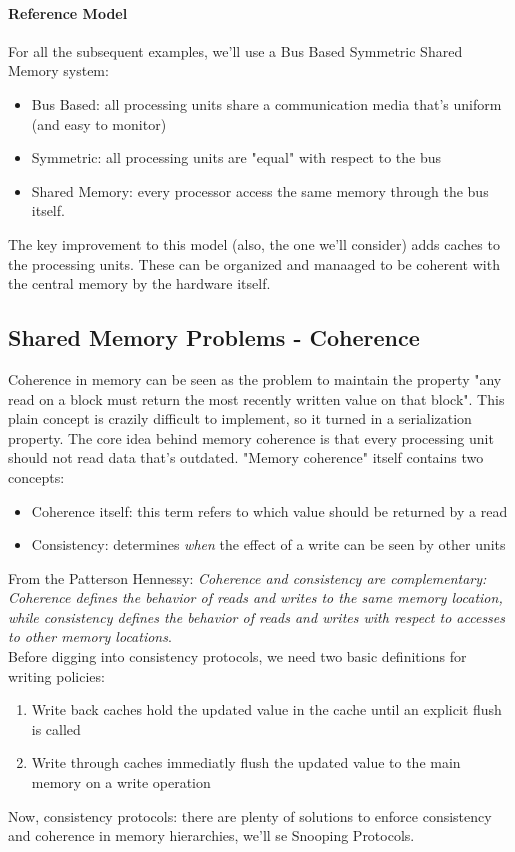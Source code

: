 \documentclass[10pt,a4paper]{article}
\begin{document}
			\paragraph{Reference Model}
				For all the subsequent examples, we'll use a Bus Based Symmetric Shared Memory system:
				\begin{itemize}
					\item Bus Based: all processing units share a communication media that's uniform (and easy to monitor)
					\item Symmetric: all processing units are "equal" with respect to the bus
					\item Shared Memory: every processor access the same memory through the bus itself.
				\end{itemize}
				The key improvement to this model (also, the one we'll consider) adds caches to the processing units. These can be organized and manaaged to be coherent with the central memory by the hardware itself. 
			
			\subsection{Shared Memory Problems - Coherence}
				Coherence in memory can be seen as the problem to maintain the property "any read on a block must return the most recently written value on that block". This plain concept is crazily difficult to implement, so it turned in a serialization property. The core idea behind memory coherence is that every processing unit should not read data that's outdated. "Memory coherence" itself contains two concepts:
				\begin{itemize}
					\item Coherence itself: this term refers to which value should be returned by a read
					\item Consistency: determines \emph{when} the effect of a write can be seen by other units
				\end{itemize}
				From the Patterson Hennessy: \emph{Coherence and consistency are complementary: Coherence defines the behavior of reads and writes to the same memory location, while consistency defines the behavior of reads and writes with respect to accesses to other memory locations}.\\
				Before digging into consistency protocols, we need two basic definitions for writing policies:
				\begin{enumerate}
					\item Write back caches hold the updated value in the cache until an explicit flush is called
					\item Write through caches immediatly flush the updated value to the main memory on a write operation
				\end{enumerate}
				Now, consistency protocols: there are plenty of solutions to enforce consistency and coherence in memory hierarchies, we'll se Snooping Protocols.
				
\end{document}
